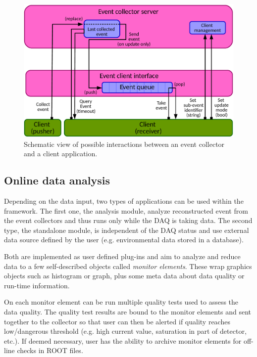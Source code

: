 \documentclass[conference]{IEEEtran}
\begin{document}
\begin{figure}[htbp]
  \begin{center}
    \includegraphics[width=0.95\linewidth]{figs/EventCollectorDiagram.pdf}
    \caption{\label{fig:DQMDataAccess} Schematic view of possible interactions between an event collector and a client application.}
  \end{center}
\end{figure}

\subsection{Online data analysis}
Depending on the data input, two types of applications can be used within the framework. The first one, the analysis module, analyze reconstructed event from the event collectors and thus runs only while the DAQ is taking data. The second type, the standalone module, is independent of the DAQ status and use external data source defined by the user (e.g. environmental data stored in a database).

Both are implemented as user defined plug-ins and aim to analyze and reduce data to a few self-described objects called \emph{monitor elements}. These wrap graphics objects such as histogram or graph, plus some meta data about data quality or run-time information. 

On each monitor element can be run multiple quality tests used to assess the data quality. The quality test results are bound to the monitor elements and sent together to the collector so that user can then be alerted if quality reaches low/dangerous threshold (e.g. high current value, saturation in part of detector, etc.). If deemed necessary, user has the ability to archive monitor elements for off-line checks in ROOT files.
\end{document}
